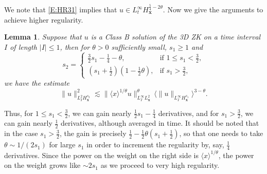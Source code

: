 \documentclass[12pt,letterpaper]{amsart}
\newcommand{\la}{\langle}
\newcommand{\ra}{\rangle}
\newtheorem{lemma}[theorem]{Lemma}
\theoremstyle{remark}
\numberwithin{equation}{section}
\numberwithin{theorem}{section}
\numberwithin{table}{section}
\begin{document}
We note that \eqref{E:HR31} implies that $u \in L_t^\infty H_{\mathbf{x}}^{\frac54-2\theta}$.  Now we give the arguments to achieve higher regularity. 

\begin{lemma}
Suppose that $u$ is a Class B solution of the 3D ZK on a time interval $I$ of length $|I|\leq 1$, then for $\theta>0$ sufficiently small, $s_1\geq 1$ and 
\begin{equation}
\label{E:s2s1}
s_2 = 
\begin{cases}
\frac32s_1-\frac14 - \theta,  & \text{if }1\leq s_1 < \frac32, \\
(s_1+\frac12)(1- \frac12\theta), & \text{if } s_1> \frac32,
\end{cases}
\end{equation}
we have the estimate
\begin{equation}
\label{E:HR12}
\| u\|_{L_I^2H_{\mathbf{x}}^{s_2}}^2 \lesssim \|\la x \ra^{1/\theta} u \|_{L_I^\infty L_{\mathbf{x}}^2}^\theta \, \la \| u \|_{L_I^\infty H_{\mathbf{x}}^{s_1}} \ra^{3-\theta}.
\end{equation}
\end{lemma}
Thus, for $1\leq s_1 < \frac32$, we can gain nearly $\frac12 s_1-\frac14$ derivatives, and for $s_1>\frac32$, we can gain nearly $\frac12$ derivatives, although averaged in time.  It should be noted that in the case $s_1>\frac32$, the gain is precisely $\frac12 - \frac12\theta(s_1+\frac12)$, so that one needs to take $\theta \sim 1/(2s_1)$ for large $s_1$ in order to increment the regularity by, say, $\frac14$ derivatives.  Since the power on the weight on the right side is $\la x \ra^{1/\theta}$,  the power on the weight grows like $\sim 2s_1$ as we proceed to very high regularity.  
\end{document}
